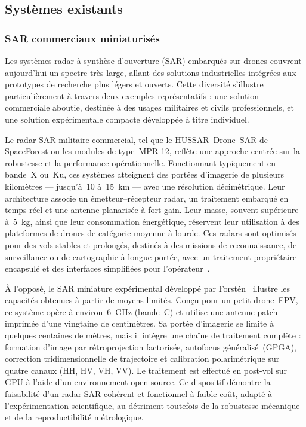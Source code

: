 \subsection{Systèmes existants}

\subsubsection{SAR commerciaux miniaturisés}

Les systèmes radar à synthèse d’ouverture (SAR) embarqués sur drones couvrent aujourd’hui un spectre très large, allant des solutions industrielles intégrées aux prototypes de recherche plus légers et ouverts. Cette diversité s’illustre particulièrement à travers deux exemples représentatifs : une solution commerciale aboutie, destinée à des usages militaires et civils professionnels, et une solution expérimentale compacte développée à titre individuel.

Le radar SAR militaire commercial, tel que le HUSSAR~Drone~SAR de SpaceForest ou les modules de type~MPR-12, reflète une approche centrée sur la robustesse et la performance opérationnelle. Fonctionnant typiquement en bande~X ou~Ku, ces systèmes atteignent des portées d’imagerie de plusieurs kilomètres — jusqu’à~10 à~15~km — avec une résolution décimétrique. Leur architecture associe un émetteur–récepteur radar, un traitement embarqué en temps réel et une antenne planarisée à fort gain. Leur masse, souvent supérieure à~5~kg, ainsi que leur consommation énergétique, réservent leur utilisation à des plateformes de drones de catégorie moyenne à lourde. Ces radars sont optimisés pour des vols stables et prolongés, destinés à des missions de reconnaissance, de surveillance ou de cartographie à longue portée, avec un traitement propriétaire encapsulé et des interfaces simplifiées pour l’opérateur~\cite{HUSSAR2025}.

À l’opposé, le SAR miniature expérimental développé par Forstén~\cite{Forsten2025} illustre les capacités obtenues à partir de moyens limités. Conçu pour un petit drone~FPV, ce système opère à environ~6~GHz (bande~C) et utilise une antenne patch imprimée d’une vingtaine de centimètres. Sa portée d’imagerie se limite à quelques centaines de mètres, mais il intègre une chaîne de traitement complète : formation d’image par rétroprojection factorisée, autofocus généralisé~(GPGA), correction tridimensionnelle de trajectoire et calibration polarimétrique sur quatre canaux (HH, HV, VH, VV). Le traitement est effectué en post-vol sur GPU à l’aide d’un environnement open-source. Ce dispositif démontre la faisabilité d’un radar SAR cohérent et fonctionnel à faible coût, adapté à l’expérimentation scientifique, au détriment toutefois de la robustesse mécanique et de la reproductibilité métrologique.

